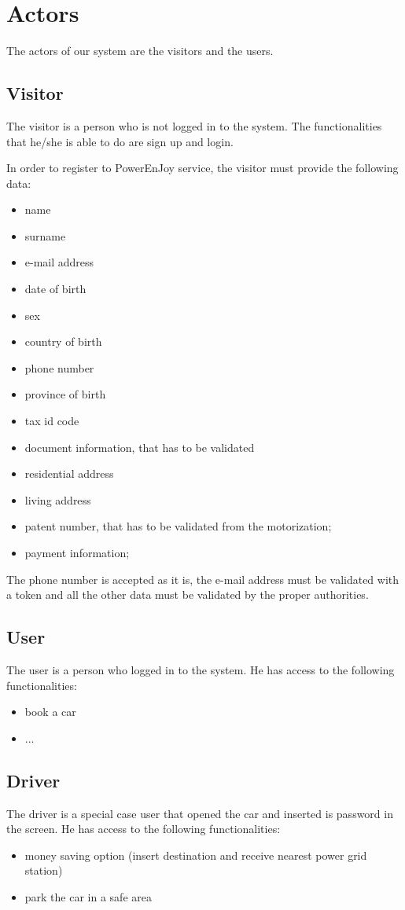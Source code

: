 \section{Actors}
The actors of our system are the visitors and the users.

\subsection{Visitor}
The visitor is a person who is not logged in to the system. The functionalities that he/she is able to do are sign up and login.

In order to register to PowerEnJoy service, the visitor must provide the following data:
\begin{itemize}
	\item name
	\item surname
	\item e-mail address
	\item date of birth
	\item sex
	\item country of birth
	\item phone number
	\item province of birth
	\item tax id code %
	\item document information, that has to be validated
	\item residential address
	\item living address
	\item patent number, that has to be validated from the motorization;
	\item payment information;
\end{itemize}

The phone number is accepted as it is, the e-mail address must be validated with a token and all
the other data must be validated by the proper authorities.

\subsection{User}
The user is a person who logged in to the system. He has access to the following functionalities:
\begin{itemize}
	\item book a car
	\item ...
\end{itemize}

\subsection{Driver}
The driver is a special case user that opened the car and inserted is password in the screen. He has access to the following functionalities:
\begin{itemize}
	\item money saving option (insert destination and receive nearest power grid station)
	\item park the car in a safe area
\end{itemize}